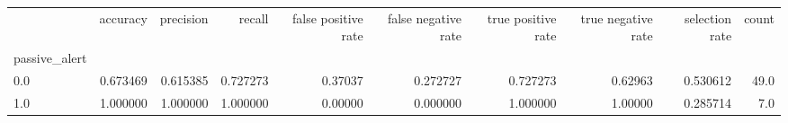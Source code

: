 \begin{tabular}{lrrrrrrrrr}
\toprule
{} &  accuracy &  precision &    recall &  false positive rate &  false negative rate &  true positive rate &  true negative rate &  selection rate &  count \\
passive\_alert &           &            &           &                      &                      &                     &                     &                 &        \\
\midrule
0.0           &  0.673469 &   0.615385 &  0.727273 &              0.37037 &             0.272727 &            0.727273 &             0.62963 &        0.530612 &   49.0 \\
1.0           &  1.000000 &   1.000000 &  1.000000 &              0.00000 &             0.000000 &            1.000000 &             1.00000 &        0.285714 &    7.0 \\
\bottomrule
\end{tabular}
